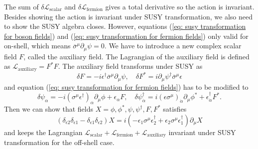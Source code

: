 \documentclass[12pt]{report}
\begin{document}
The sum of $\delta \mathcal{L}_{\mathrm{scalar}}$ and $\delta \mathcal{L}_{\mathrm{fermion}}$ gives a total derivative so the action is invariant.
Besides showing the action is invariant under SUSY transformation, we also need to show the SUSY algebra closes.
However, equations (\ref{eq: susy transformation for boson fields}) and (\ref{eq: susy transformation for fermion fields}) only valid for on-shell, which means $\overline{\sigma}^{\mu} \partial_{\mu} \psi = 0$.
We have to introduce a new complex scalar field $F$, called the auxiliary field. %
The Lagrangian of the auxiliary field is defined as $\mathcal{L}_{\mathrm{auxiliary}} = F^{*} F$.
The auxiliary field transforms under SUSY as
\begin{equation}
\delta F = - i \epsilon^{\dag} \overline{\sigma}^{\mu} \partial_{\mu} \psi, \quad 
\delta F^{*} = i \partial_{\mu} \psi^{\dag} \overline{\sigma}^{\mu} \epsilon
\end{equation}
and equation (\ref{eq: susy transformation for fermion fields}) has to be modified to
\begin{equation}
\delta \psi_{\alpha} = -i (\sigma^{\mu} \epsilon^{\dag})_{\alpha} \partial_{\mu} \phi + \epsilon_{\alpha} F, \quad 
\delta \psi^{\dag}_{\dot{\alpha}} = i (\epsilon \sigma^{\mu})_{\dot{\alpha}} \partial_{\mu} \phi^{*} + \epsilon^{\dag}_{\dot{\alpha}} F^{*}.
\end{equation}
Then we can show that fields $X = \phi, \phi^{*}, \psi, \psi^{\dag}, F, F^{*}$ satisfies
\begin{equation}
(\delta_{\epsilon2} \delta_{\epsilon1} - \delta_{\epsilon1} \delta_{\epsilon2}) X = i (- \epsilon_{1} \sigma^{\mu} \epsilon^{\dag}_{2} + \epsilon_{2} \sigma^{\mu} \epsilon^{\dag}_{1}) \partial_{\mu} X
\end{equation}
and keeps the Lagrangian $\mathcal{L}_{\mathrm{scalar}} + \mathcal{L}_{\mathrm{fermion}} + \mathcal{L}_{\mathrm{auxiliary}}$ invariant under SUSY transformation for the off-shell case.

\end{document}

